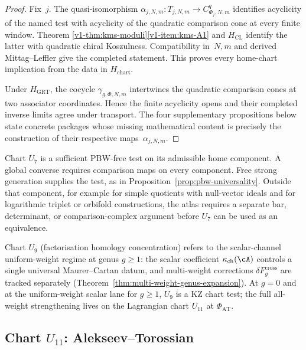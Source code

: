 \begin{proof}
Fix~$j$.  The quasi-isomorphism
$\alpha_{j,N,m}\colon T_{j,N,m}\to C^q_{\Phi_j,N,m}$ identifies
acyclicity of the named test with acyclicity of the quadratic
comparison cone at every finite window.  Theorem
\ref{v1-thm:kms-moduli}\ref{v1-item:kms-A1} and
$H_{\mathrm{CL}}$ identify the latter with quadratic chiral
Koszulness.  Compatibility in~$N,m$ and derived Mittag--Leffler give
the completed statement.  This proves every home-chart implication
from the data in $H_{\mathrm{chart}}$.

Under $H_{\mathrm{GRT}}$, the cocycle
$\gamma_{g,\Phi,N,m}$ intertwines the quadratic comparison cones at
two associator coordinates.  Hence the finite acyclicity opens and
their completed inverse limits agree under transport.  The four
supplementary propositions below state concrete packages whose
missing mathematical content is precisely the construction of their
respective maps~$\alpha_{j,N,m}$.
\end{proof}

\begin{remark}
\label{v1-rem:kms-pbw-universality-scope}
Chart $U_7$ is a sufficient PBW-free test on its admissible home
component.  A global converse requires comparison maps on every
component. Free strong generation supplies the test, as in
Proposition~\ref{prop:pbw-universality}. Outside that component,
for example for simple quotients with null-vector ideals and for
logarithmic triplet or orbifold constructions, the atlas requires a
separate bar, determinant, or comparison-complex argument before
$U_7$ can be used as an equivalence.
\end{remark}

\begin{remark}
\label{v1-rem:kms-uniform-weight-tag}
Chart $U_9$ (factorisation homology concentration) refers to
the scalar-channel uniform-weight regime at genus
$g\geq 1$: the scalar coefficient $\kappa_{\mathrm{ch}}(\cA)$
controls a single universal Maurer--Cartan
datum, and multi-weight corrections
$\delta F_g^{\mathrm{cross}}$ are tracked separately
(Theorem~\ref{thm:multi-weight-genus-expansion}). At
$g=0$ and at the uniform-weight scalar lane for $g\geq 1$,
$U_9$ is a KZ chart test; the full
all-weight strengthening lives on the Lagrangian chart
$U_{11}$ at $\Phi_{\mathrm{AT}}$.
\end{remark}

\subsection{Chart $U_{11}$: Alekseev--Torossian}

